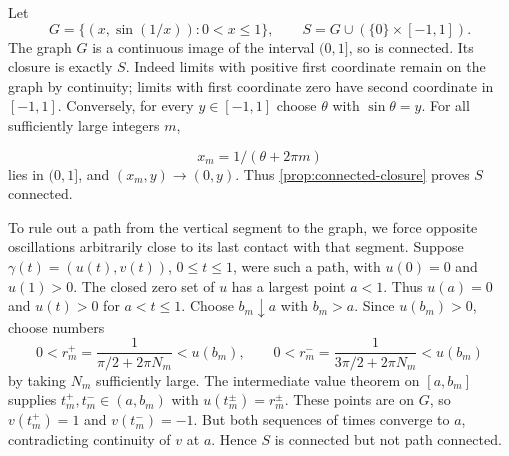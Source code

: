 \begin{example}\label{ex:topologist-sine}
Let
\[
G=\{(x,\sin(1/x)):0<x\leq1\},\qquad
S=G\cup(\{0\}\times[-1,1]).
\]
The graph $G$ is a continuous image of the interval $(0,1]$, so is connected.
Its closure is exactly $S$. Indeed limits with positive first coordinate
remain on the graph by continuity; limits with first coordinate zero have
second coordinate in $[-1,1]$. Conversely, for every $y\in[-1,1]$ choose
$\theta$ with $\sin\theta=y$. For all sufficiently large integers $m$,

\[
x_m=1/(\theta+2\pi m)
\]
 lies in $(0,1]$, and $(x_m,y)\to(0,y)$.
Thus \cref{prop:connected-closure} proves $S$ connected.

To rule out a path from the vertical segment to the graph, we force
opposite oscillations arbitrarily close to its last contact with that
segment. Suppose $\gamma(t)=(u(t),v(t))$, $0\leq t\leq1$, were such a
path, with $u(0)=0$ and $u(1)>0$. The closed zero set of $u$ has a largest
point $a<1$. Thus $u(a)=0$ and $u(t)>0$ for $a<t\leq1$.
Choose $b_m\downarrow a$ with $b_m>a$. Since $u(b_m)>0$, choose numbers
\[
0<r_m^+=\frac1{\pi/2+2\pi N_m}<u(b_m),\qquad
0<r_m^-=\frac1{3\pi/2+2\pi N_m}<u(b_m)
\]
by taking $N_m$ sufficiently large. The intermediate value theorem on
$[a,b_m]$ supplies $t_m^+,t_m^-\in(a,b_m)$ with $u(t_m^\pm)=r_m^\pm$.
These points are on $G$, so $v(t_m^+)=1$ and $v(t_m^-)=-1$.
But both sequences of times converge to $a$, contradicting continuity of
$v$ at $a$. Hence $S$ is connected but not path connected.
\end{example}


